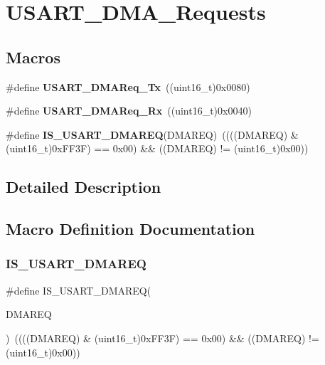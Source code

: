\section{U\+S\+A\+R\+T\+\_\+\+D\+M\+A\+\_\+\+Requests}
\label{group__USART__DMA__Requests}
\subsection*{Macros}
\begin{DoxyCompactItemize}
\item 
\#define \textbf{ U\+S\+A\+R\+T\+\_\+\+D\+M\+A\+Req\+\_\+\+Tx}~((uint16\+\_\+t)0x0080)
\item 
\#define \textbf{ U\+S\+A\+R\+T\+\_\+\+D\+M\+A\+Req\+\_\+\+Rx}~((uint16\+\_\+t)0x0040)
\item 
\#define \textbf{ I\+S\+\_\+\+U\+S\+A\+R\+T\+\_\+\+D\+M\+A\+R\+EQ}(D\+M\+A\+R\+EQ)~((((D\+M\+A\+R\+EQ) \& (uint16\+\_\+t)0x\+F\+F3\+F) == 0x00) \&\& ((\+D\+M\+A\+R\+E\+Q) != (uint16\+\_\+t)0x00))
\end{DoxyCompactItemize}


\subsection{Detailed Description}


\subsection{Macro Definition Documentation}
\mbox{\label{group__USART__DMA__Requests_ga8be7a899d21d82de2ee0a763b4564dc3}} 
\subsubsection{I\+S\+\_\+\+U\+S\+A\+R\+T\+\_\+\+D\+M\+A\+R\+EQ}
{\footnotesize\ttfamily \#define I\+S\+\_\+\+U\+S\+A\+R\+T\+\_\+\+D\+M\+A\+R\+EQ(\begin{DoxyParamCaption}\item[{}]{D\+M\+A\+R\+EQ }\end{DoxyParamCaption})~((((D\+M\+A\+R\+EQ) \& (uint16\+\_\+t)0x\+F\+F3\+F) == 0x00) \&\& ((\+D\+M\+A\+R\+E\+Q) != (uint16\+\_\+t)0x00))}



